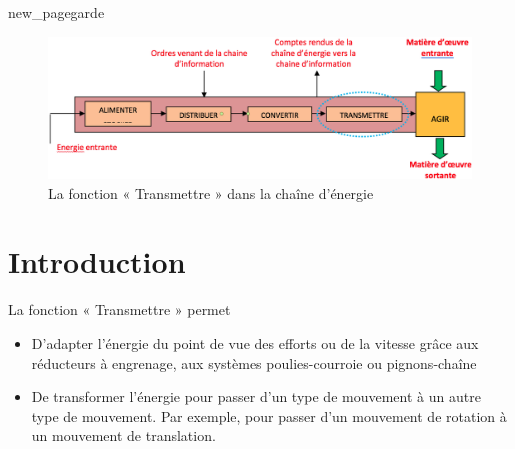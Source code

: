 \documentclass[10pt,fleqn]{article} %
\begin{document}
{new_pagegarde}
\begin{figure}[h]
  \includegraphics[width=\textwidth]{images/S03_C04}
  \caption{La fonction « Transmettre » dans la chaîne d'énergie}
  \label{fig:chaine}
\end{figure}

\section{Introduction}
\begin{aretenir}
  La fonction « Transmettre » permet
  \begin{itemize}
    \item D'adapter l’énergie du point de vue des efforts ou de la vitesse grâce aux réducteurs à engrenage, aux systèmes poulies-courroie ou pignons-chaîne
    \item De transformer l’énergie pour passer d’un type de mouvement à un autre type de mouvement. Par exemple, pour passer d’un mouvement de rotation à un mouvement de translation.
  \end{itemize}
\end{aretenir}
\end{document}
